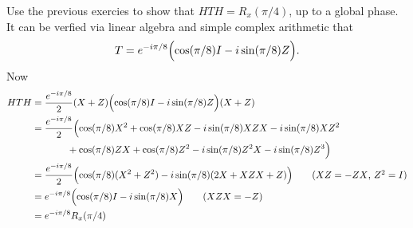  Use the previous exercies to show that $HTH = R_x(\pi/4)$, up to a global phase.
\Soln It can be verfied via linear algebra and simple complex arithmetic that $$T = e^{-i\pi/8}\Bigl(\cos(\pi/8)I-i\sin(\pi/8)Z\Bigr).$$ Now
\begin{align*}
HTH &= \frac{e^{-i\pi/8}}{2}(X+Z)\Bigl(\cos(\pi/8)I-i\sin(\pi/8)Z\Bigr)(X+Z) \\
&= \frac{e^{-i\pi/8}}{2}\Bigl(\cos(\pi/8)X^2 + \cos(\pi/8)XZ -i\sin(\pi/8)XZX - i\sin(\pi/8) XZ^2 \\ &\ \ \ \ \ \ \ \ \ \ \ +\cos(\pi/8)ZX + \cos(\pi/8)Z^2-i\sin(\pi/8)Z^2X  - i\sin(\pi/8) Z^3\Bigr)\\
&= \frac{e^{-i\pi/8}}{2}\Bigl(\cos(\pi/8)(X^2+Z^2)-i\sin(\pi/8)(2X+XZX+Z)\Bigr) \tag{$XZ=-ZX$, $Z^2=I$} \\
&= e^{-i\pi/8}\Bigl(\cos(\pi/8)I -i\sin(\pi/8)X\Bigr) \tag{$XZX=-Z$} \\
&= e^{-i\pi/8}R_x(\pi/4)
\end{align*}

